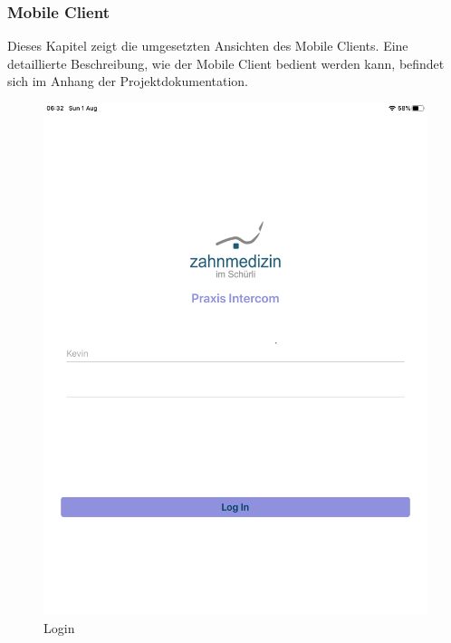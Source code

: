 \clearpage
\subsubsection{Mobile Client}\label{subsec:mobile-client-realisation}

Dieses Kapitel zeigt die umgesetzten Ansichten des Mobile Clients.
Eine detaillierte Beschreibung, wie der Mobile Client bedient werden kann, befindet sich im Anhang der Projektdokumentation.

\begin{figure}[h]
    \centering
    \begin{minipage}[b]{0.4\textwidth}
        \includegraphics[width=\textwidth]{graphics/screenshot-login}
        \caption{Login}
    \end{minipage}
    \hfill
    \begin{minipage}[b]{0.4\textwidth}

\end{minipage}
\end{figure}
